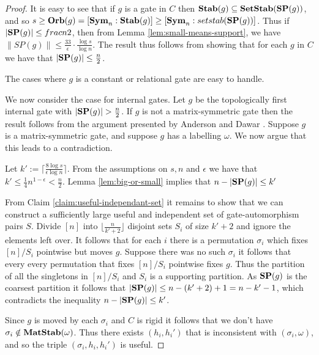 \documentclass[12pt]{report}
\newcommand{\stab}{\text{\textbf{Stab}}}
\newcommand{\setstab}{\text{\textbf{SetStab}}}
\newcommand{\matstab}{\text{\textbf{MatStab}}}
\newcommand{\sym}{\text{\textbf{Sym}}}
\newcommand{\orb}{\text{\textbf{Orb}}}
\newcommand{\SP}{\text{\textbf{SP}}}
\begin{document}
\begin{proof}
  It is easy to see that if $g$ is a gate in $C$ then $\stab (g) \subseteq
  \setstab(\SP(g))$, and so $s \geq \orb(g) = [\sym_n : \stab(g)] \geq [\sym_n :
  setstab(\SP(g))]$. Thus if $\vert \SP(g) \vert \leq frac{n}{2}$, then from
  Lemma \ref{lem:small-means-support}, we have $\| SP (g) \| \leq
  \frac{33}{\epsilon} \cdot \frac{\log s} {\log n}$. The result thus follows
  from showing that for each $g$ in $C$ we have that $\vert \SP (g) \vert \leq
  \frac{n}{2}$.
  
  The cases where $g$ is a constant or relational gate are easy to handle.

  We now consider the case for internal gates. Let $g$ be the topologically
  first internal gate with $\vert \SP(g) \vert > \frac{n}{2}$. If $g$ is not a
  matrix-symmetric gate then the result follows from the argument presented by
  Anderson and Dawar \cite{AndersonD17}. Suppose $g$ is a matrix-symmetric gate, and
  suppose $g$ has a labelling $\omega$. We now argue that this leads to a
  contradiction.

  Let $k' := \lceil \frac{8 \log s}{\epsilon \log n} \rceil$. From the
  assumptions on $s, n$ and $\epsilon$ we have that $k' \leq
  \frac{1}{4}n^{1-\epsilon} < \frac{n}{2}$. Lemma \ref{lem:big-or-small} implies
  that $n - \vert \SP(g) \vert \leq k'$
  
  From Claim \ref{claim:useful-independant-set} it remains to show that we can
  construct a sufficiently large useful and independent set of gate-automorphism
  pairs $S$. Divide $[n]$ into $\lfloor \frac{n}{k' + 2} \rfloor$ disjoint sets
  $S_i$ of size $k' + 2$ and ignore the elements left over. It follows that for
  each $i$ there is a permutation $\sigma_i$ which fixes $[n] / S_i$ pointwise
  but moves $g$. Suppose there was no such $\sigma_i$ it follows that every
  every permutation that fixes $[n]/S_i$ pointwise fixes $g$. Thus the partition
  of all the singletons in $[n]/S_i$ and $S_i$ is a supporting partition. As
  $\SP(g)$ is the coarsest partition it follows that $\vert \SP(g) \vert \leq n
  - (k'+2) + 1 = n - k' - 1$, which contradicts the inequality $n - \vert \SP(g)
  \vert \leq k'$.

  Since $g$ is moved by each $\sigma_i$ and $C$ is rigid it follows that we
  don't have $\sigma_i \notin \matstab(\omega)$. Thus there exists $(h_i, h_i')$
  that is inconsistent with $(\sigma_i, \omega)$, and so the triple $(\sigma_i,
  h_i, h_i')$ is useful.


\end{proof}
\end{document}

